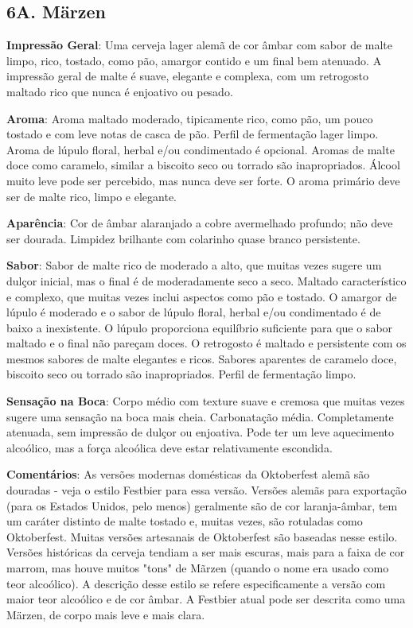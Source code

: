 \subsection*{6A. Märzen}
\textbf{Impressão Geral}: Uma cerveja lager alemã de cor âmbar com sabor de malte limpo, rico, tostado, como pão, amargor contido e um final bem atenuado. A impressão geral de malte é suave, elegante e complexa, com um retrogosto maltado rico que nunca é enjoativo ou pesado.

\textbf{Aroma}: Aroma maltado moderado, tipicamente rico, como pão, um pouco tostado e com leve notas de casca de pão. Perfil de fermentação lager limpo. Aroma de lúpulo floral, herbal e/ou condimentado é opcional. Aromas de malte doce como caramelo, similar a biscoito seco ou torrado são inapropriados. Álcool muito leve pode ser percebido, mas nunca deve ser forte. O aroma primário deve ser de malte rico, limpo e elegante.

\textbf{Aparência}: Cor de âmbar alaranjado a cobre avermelhado profundo; não deve ser dourada. Limpidez brilhante com colarinho quase branco persistente.

\textbf{Sabor}: Sabor de malte rico de moderado a alto, que muitas vezes sugere um dulçor inicial, mas o final é de moderadamente seco a seco. Maltado característico e complexo, que muitas vezes inclui aspectos como pão e tostado. O amargor de lúpulo é moderado e o sabor de lúpulo floral, herbal e/ou condimentado é de baixo a inexistente. O lúpulo proporciona equilíbrio suficiente para que o sabor maltado e o final não pareçam doces. O retrogosto é maltado e persistente com os mesmos sabores de malte elegantes e ricos. Sabores aparentes de caramelo doce, biscoito seco ou torrado são inapropriados. Perfil de fermentação limpo.

\textbf{Sensação na Boca}: Corpo médio com texture suave e cremosa que muitas vezes sugere uma sensação na boca mais cheia. Carbonatação média. Completamente atenuada, sem impressão de dulçor ou enjoativa. Pode ter um leve aquecimento alcoólico, mas a força alcoólica deve estar relativamente escondida.

\textbf{Comentários}: As versões modernas domésticas da Oktoberfest alemã são douradas - veja o estilo Festbier para essa versão. Versões alemãs para exportação (para os Estados Unidos, pelo menos) geralmente são de cor laranja-âmbar, tem um caráter distinto de malte tostado e, muitas vezes, são rotuladas como Oktoberfest. Muitas versões artesanais de Oktoberfest são baseadas nesse estilo. Versões históricas da cerveja tendiam a ser mais escuras, mais para a faixa de cor marrom, mas houve muitos "tons" de Mãrzen (quando o nome era usado como teor alcoólico). A descrição desse estilo se refere especificamente a versão com maior teor alcoólico e de cor âmbar. A Festbier atual pode ser descrita como uma Märzen, de corpo mais leve e mais clara.

